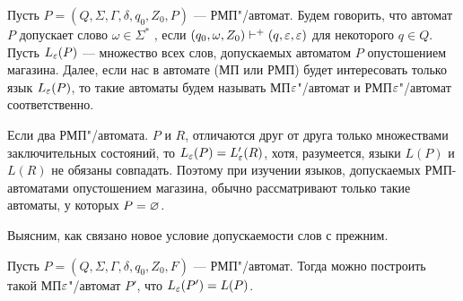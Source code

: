 Пусть $P=(Q,\Sigma,\Gamma,\delta,q_0,Z_0,P)$ --- РМП"/автомат. Будем говорить, что автомат $P$ допускает слово $\omega\in\Sigma^*$ , если $(q_0,\omega,Z_0)\vdash^+(q,\varepsilon,\varepsilon)$ для некоторого $q\in Q$. Пусть $L_\varepsilon(P)$ --- множество всех слов, допускаемых автоматом $P$ опустошением магазина. Далее, если нас в автомате (МП или РМП) будет интересовать только язык $L_\varepsilon(P)$, то такие автоматы будем называть МП$\varepsilon$"/автомат и РМП$\varepsilon$"/автомат соответственно.

Если два РМП"/автомата. $P$ и $R$, отличаются друг от друга только множествами заключительных состояний, то $L_\varepsilon(P)=L'_\varepsilon(R)$, хотя, разумеется, языки $L(P)$ и $L(R)$ не обязаны совпадать. Поэтому при изучении языков, допускаемых РМП-автоматами опустошением магазина, обычно рассматривают только такие автоматы, у которых $P=\varnothing$.

Выясним, как связано новое условие допускаемости слов с прежним.

\begin{mytheorem}
\label{theorem-eqMPandMPeps}
Пусть $P=(Q,\Sigma,\Gamma,\delta,q_0,Z_0,F)$ --- РМП"/автомат. Тогда можно построить такой МП$\varepsilon$"/автомат $P'$, что $L_\varepsilon(P')=L(P)$.
\end{mytheorem}

